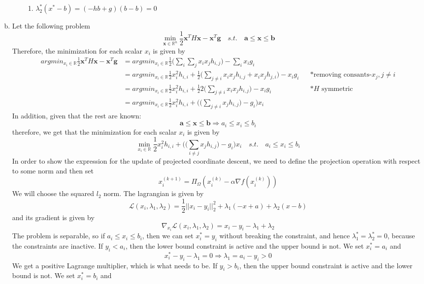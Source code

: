 \documentclass{article}
\begin{document}
\begin{enumerate}[(a)]
\begin{enumerate}
\begin{enumerate}[(1)]
\item $\lambda_2^*(x^*-b) = (-hb+g)(b-b) = 0$
\end{enumerate} 
\end{enumerate}
\item Let the following problem
\[\min_{\mathbf{x}\in \mathbb{R}^n}\frac{1}{2}\mathbf{x}^TH \mathbf{x}-\mathbf{x}^T\mathbf{g} \quad s.t. \quad \mathbf{a}\le \mathbf{x}\le \mathbf{b} \]
Therefore, the minimization for each scalar $x_i$ is given by
\begin{align*}
argmin_{x_i\in \mathbb{R}}\frac{1}{2}\mathbf{x}^TH \mathbf{x}-\mathbf{x}^T\mathbf{g} 
&= argmin_{x_i\in \mathbb{R}}\frac{1}{2}\Big(\sum_i\sum_jx_ix_jh_{i,j}\Big)-\sum_ix_ig_i\\
&= argmin_{x_i\in \mathbb{R}}\frac{1}{2}x_i^2h_{i,i}+\frac{1}{2}\Big(\sum_{j\ne i}x_ix_jh_{i,j}+x_ix_jh_{j,i}\Big)-x_ig_i &&*\text{removing consants-$x_j, j\ne i$}\\
&= argmin_{x_i\in \mathbb{R}}\frac{1}{2}x_i^2h_{i,i}+\frac{1}{2}2\Big(\sum_{j\ne i}x_ix_jh_{i,j}\Big)-x_ig_i &&*\text{$H$ symmetric}\\
&= argmin_{x_i\in \mathbb{R}}\frac{1}{2}x_i^2h_{i,i}+\Big(\Big(\sum_{j\ne i}x_jh_{i,j}\Big)-g_i\Big)x_i
\end{align*}
In addition, given that the rest are known:
\[\mathbf{a}\le \mathbf{x}\le \mathbf{b} \Rightarrow a_i \le x_i \le b_i\]
therefore, we get  that the minimization for each scalar $x_i$ is given by
\[\min_{x_i\in \mathbb{R}}\frac{1}{2}x_i^2h_{i,i}+\Big(\Big(\sum_{i\ne j}x_jh_{i,j}\Big)-g_i\Big)x_i \quad s.t. \quad a_i \le x_i \le b_i\]
In order to show the expression for the update of projected coordinate descent, we need to define the projection operation with respect to some norm and then set
\[x_i^{(k+1)} = \Pi_\Omega (x_i^{(k)} -\alpha \nabla f(x_i^{(k)})) \]
We will choose the squared $l_2$ norm. The lagrangian is given by
\[\mathcal{L}(x_i, \lambda_1, \lambda_2) = \frac{1}{2}||x_i-y_i||_2^2+\lambda_1(-x+a)+\lambda_2(x-b)       \]
and its gradient is given by
\[  \nabla_{x_i} \mathcal{L}(x_i, \lambda_1, \lambda_2) = x_i-y_i -\lambda_1+\lambda_2     \]
The problem is separable, so if $a_i \le x_i \le b_i$, then we can set $x_i^* = y_i$ without breaking the constraint, and hence $\lambda_1^*=\lambda_2^*=0$, because the
constraints are inactive. If $y_i < a_i$, then the lower bound constraint is active and the upper bound is not. We set $x_i^* = a_i$ and
\[x_i^* - y_i-\lambda_1 = 0 \Rightarrow\lambda_1 = a_i-y_i > 0 \]
We get a positive Lagrange multiplier, which is what needs to be. If $y_i>b_i$, then the upper bound constraint is active and the lower bound is not. We set $x_i^* = b_i$ and

\end{enumerate}
\end{document}
